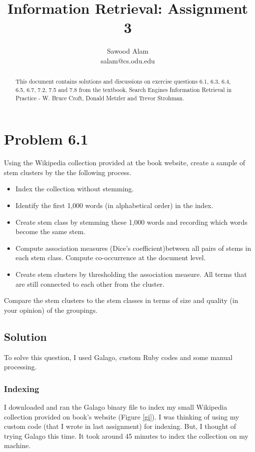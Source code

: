 \documentclass[letterpaper,12pt]{article}
\title{Information Retrieval: Assignment 3}
\author{Sawood Alam\\ salam@cs.odu.edu}
\begin{document}
\maketitle
\date{}

\begin{abstract}
This document contains solutions and discussions on exercise questions 6.1, 6.3, 6.4, 6.5, 6.7, 7.2, 7.5 and 7.8 from the textbook, Search Engines Information Retrieval in Practice - W. Bruce Croft, Donald Metzler and Trevor Strohman.
\end{abstract}
\pagebreak

\section{Problem 6.1}

Using the Wikipedia collection provided at the book website, create a sample of stem clusters by the the following process.

\begin{itemize}
\item Index the collection without stemming.
\item Identify the first 1,000 words (in alphabetical order) in the index.
\item Create stem class by stemming these 1,000 words and recording which words become the same stem.
\item Compute association measures (Dice's coefficient)between all pairs of stems in each stem class. Compute co-occurrence at the document level.
\item Create stem clusters by thresholding the association measure. All terms that are still connected to each other from the cluster.
\end{itemize}

Compare the stem clusters to the stem classes in terms of size and quality (in your opinion) of the groupings.


\subsection{Solution}

To solve this question, I used Galago, custom Ruby codes and some manual processing.

\subsubsection{Indexing}

I downloaded and ran the Galago binary file to index my small Wikipedia collection provided on book's website (Figure \ref{gi}). I was thinking of using my custom code (that I wrote in last assignment) for indexing. But, I thought of trying Galago this time. It took around 45 minutes to index the collection on my machine.
\end{document}
